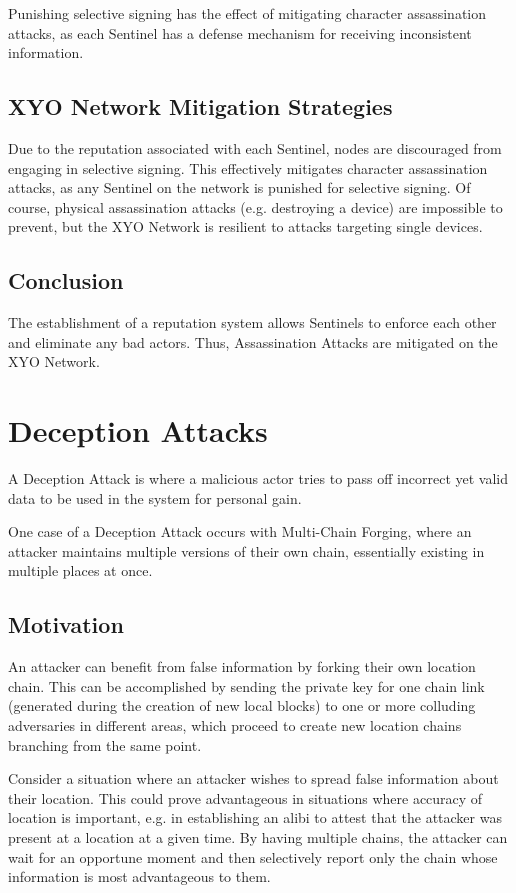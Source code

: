 \documentclass{article}
\begin{document}
Punishing selective signing has the effect of mitigating character assassination attacks, as each Sentinel has a defense mechanism for receiving inconsistent information.

\subsection{XYO Network Mitigation Strategies}

Due to the reputation associated with each Sentinel, nodes are discouraged from engaging in selective signing. This effectively mitigates character assassination attacks, as any Sentinel on the network is punished for selective signing. Of course, physical assassination attacks (e.g. destroying a device) are impossible to prevent, but the XYO Network is resilient to attacks targeting single devices.

\subsection{Conclusion}

The establishment of a reputation system allows Sentinels to enforce each other and eliminate any bad actors. Thus, Assassination Attacks are mitigated on the XYO Network.

\section{Deception Attacks}
A Deception Attack is where a malicious actor tries to pass off incorrect yet valid data to be used in the system for personal gain.

One case of a Deception Attack occurs with Multi-Chain Forging, where an attacker maintains multiple versions of their own chain, essentially existing in multiple places at once.

\subsection{Motivation}

An attacker can benefit from false information by forking their own location chain. This can be accomplished by sending the private key for one chain link (generated during the creation of new local blocks) to one or more colluding adversaries in different areas, which proceed to create new location chains branching from the same point.

Consider a situation where an attacker wishes to spread false information about their location. This could prove advantageous in situations where accuracy of location is important, e.g. in establishing an alibi to attest that the attacker was present at a location at a given time. By having multiple chains, the attacker can wait for an opportune moment and then selectively report only the chain whose information is most advantageous to them.
\end{document}
